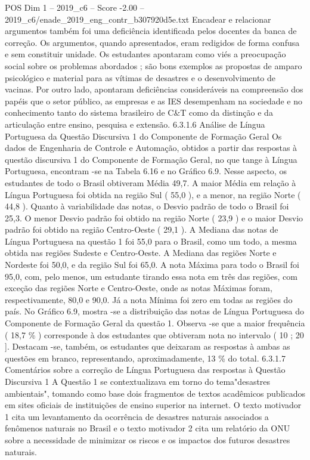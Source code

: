 \begin{textsample}{POS Dim 1 – 2019\_c6 – Score -2.00 – 2019\_c6/enade\_2019\_eng\_contr\_b307920d5e.txt}
Encadear e relacionar argumentos também foi uma deficiência identificada pelos docentes da banca de correção.
Os argumentos, quando apresentados, eram redigidos de forma confusa e sem constituir unidade.
Os estudantes apontaram como viés a preocupação social sobre os problemas abordados ; são bons exemplos as propostas de amparo psicológico e material para as vítimas de desastres e o desenvolvimento de vacinas.
Por outro lado, apontaram deficiências consideráveis na compreensão dos papéis que o setor público, as empresas e as IES desempenham na sociedade e no conhecimento tanto do sistema brasileiro de C\&T como da distinção e da articulação entre ensino, pesquisa e extensão. 6.3.1.6 Análise de Língua Portuguesa da Questão Discursiva 1 do Componente de Formação Geral Os dados de Engenharia de Controle e Automação, obtidos a partir das respostas à questão discursiva 1 do Componente de Formação Geral, no que tange à Língua Portuguesa, encontram -se na Tabela 6.16 e no Gráfico 6.9.
Nesse aspecto, os estudantes de todo o Brasil obtiveram Média 49,7.
A maior Média em relação à Língua Portuguesa foi obtida na região Sul ( 55,0 ), e a menor, na região Norte ( 44,8 ).
Quanto à variabilidade das notas, o Desvio padrão de todo o Brasil foi 25,3.
O menor Desvio padrão foi obtido na região Norte ( 23,9 ) e o maior Desvio padrão foi obtido na região Centro-Oeste ( 29,1 ).
A Mediana das notas de Língua Portuguesa na questão 1 foi 55,0 para o Brasil, como um todo, a mesma obtida nas regiões Sudeste e Centro-Oeste.
A Mediana das regiões Norte e Nordeste foi 50,0, e da região Sul foi 65,0.
A nota Máxima para todo o Brasil foi 95,0, com, pelo menos, um estudante tirando essa nota em três das regiões, com exceção das regiões Norte e Centro-Oeste, onde as notas Máximas foram, respectivamente, 80,0 e 90,0.
Já a nota Mínima foi zero em todas as regiões do país.
No Gráfico 6.9, mostra -se a distribuição das notas de Língua Portuguesa do Componente de Formação Geral da questão 1.
Observa -se que a maior frequência ( 18,7 \% ) corresponde à dos estudantes que obtiveram nota no intervalo ( 10 ; 20 ].
Destacam -se, também, os estudantes que deixaram as respostas à ambas as questões em branco, representando, aproximadamente, 13 \% do total. 6.3.1.7 Comentários sobre a correção de Língua Portuguesa das respostas à Questão Discursiva 1 A Questão 1 se contextualizava em torno do tema"desastres ambientais", tomando como base dois fragmentos de textos acadêmicos publicados em sites oficiais de instituições de ensino superior na internet.
O texto motivador 1 cita um levantamento da ocorrência de desastres naturais associados a fenômenos naturais no Brasil e o texto motivador 2 cita um relatório da ONU sobre a necessidade de minimizar os riscos e os impactos dos futuros desastres naturais.

\end{textsample}
